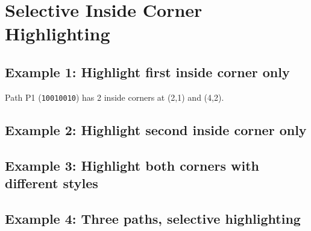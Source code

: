 \documentclass{article}
\begin{document}
\section{Selective Inside Corner Highlighting}

\subsection{Example 1: Highlight first inside corner only}

Path P1 (\texttt{10010010}) has 2 inside corners at (2,1) and (4,2).

\begin{center}
\end{center}

\subsection{Example 2: Highlight second inside corner only}

\begin{center}
\end{center}

\subsection{Example 3: Highlight both corners with different styles}

\begin{center}
\end{center}

\subsection{Example 4: Three paths, selective highlighting}
\end{document}
